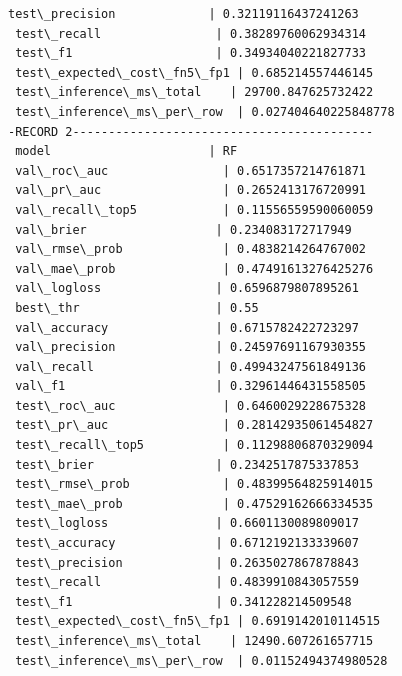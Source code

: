 \documentclass[11pt]{article}
\begin{document}
\begin{Verbatim}[commandchars=\\\{\}]
 test\_precision             | 0.32119116437241263
 test\_recall                | 0.38289760062934314
 test\_f1                    | 0.34934040221827733
 test\_expected\_cost\_fn5\_fp1 | 0.685214557446145
 test\_inference\_ms\_total    | 29700.847625732422
 test\_inference\_ms\_per\_row  | 0.027404640225848778
-RECORD 2------------------------------------------
 model                      | RF
 val\_roc\_auc                | 0.6517357214761871
 val\_pr\_auc                 | 0.2652413176720991
 val\_recall\_top5            | 0.11556559590060059
 val\_brier                  | 0.234083172717949
 val\_rmse\_prob              | 0.4838214264767002
 val\_mae\_prob               | 0.47491613276425276
 val\_logloss                | 0.6596879807895261
 best\_thr                   | 0.55
 val\_accuracy               | 0.6715782422723297
 val\_precision              | 0.24597691167930355
 val\_recall                 | 0.49943247561849136
 val\_f1                     | 0.32961446431558505
 test\_roc\_auc               | 0.6460029228675328
 test\_pr\_auc                | 0.28142935061454827
 test\_recall\_top5           | 0.11298806870329094
 test\_brier                 | 0.2342517875337853
 test\_rmse\_prob             | 0.48399564825914015
 test\_mae\_prob              | 0.47529162666334535
 test\_logloss               | 0.6601130089809017
 test\_accuracy              | 0.6712192133339607
 test\_precision             | 0.2635027867878843
 test\_recall                | 0.4839910843057559
 test\_f1                    | 0.341228214509548
 test\_expected\_cost\_fn5\_fp1 | 0.6919142010114515
 test\_inference\_ms\_total    | 12490.607261657715
 test\_inference\_ms\_per\_row  | 0.01152494374980528

    \end{Verbatim}
\end{document}
